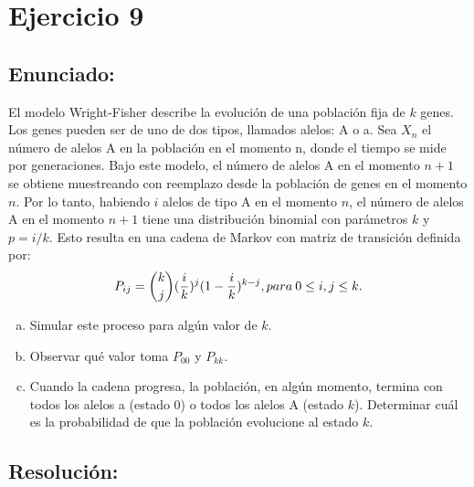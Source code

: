 \documentclass{article}
\begin{document}
\section*{Ejercicio 9}
\subsection*{Enunciado:}
El modelo Wright-Fisher describe la evolución de una población fija de $k$ genes. Los genes pueden ser de uno de dos tipos, llamados alelos: A o a. Sea $X_n$ el número de alelos A en la población en el momento n, donde el tiempo se mide por generaciones. Bajo este modelo, el número de alelos A en el momento $n+1$ se obtiene muestreando con reemplazo desde la población de genes en el momento $n$. Por lo tanto, habiendo $i$ alelos de tipo A en el momento $n$, el número de alelos A en el momento $n+1$ tiene una distribución binomial con parámetros $k$ y $p = i/k$. Esto resulta en una cadena de Markov con matriz de transición definida por:
$$P_{ij} = {k\choose j}({i\over k})^j (1-{i\over k})^{k-j}, para \: 0\leq i,j \leq k .$$
\begin{enumerate}[(a)] 

\item Simular este proceso para algún valor de $k$.
\item Observar qué valor toma $P_{00}$ y $P_{kk}$.
\item Cuando la cadena progresa, la población, en algún momento, termina con todos los alelos a (estado 0) o todos los alelos A (estado $k$). Determinar cuál es la probabilidad de que la población evolucione al estado $k$.
\end{enumerate}
\pagebreak
\subsection*{Resolución:}
\end{document}
